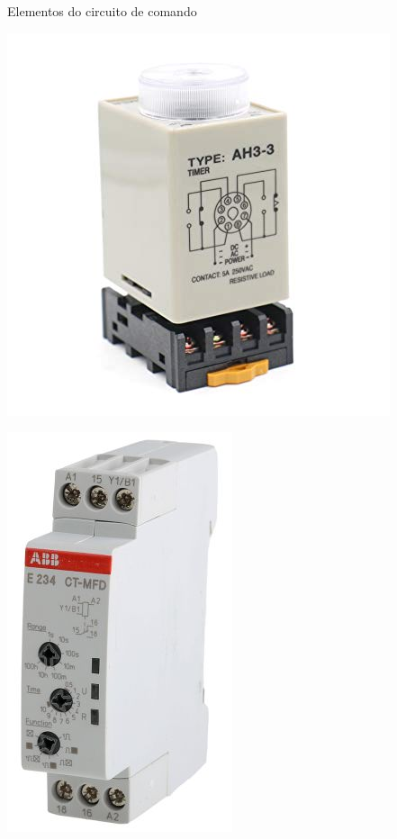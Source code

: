 \begin{frame}{Elementos do circuito de comando}
\begin{minipage}{0.45\linewidth}
	\centering
	\includegraphics[width=1.3\linewidth]{Figuras/Ch06/fig15.jpg}
\end{minipage}
\hfill
\begin{minipage}{0.45\linewidth}
	\centering
	\includegraphics[width=0.6\linewidth]{Figuras/Ch06/fig16.jpg}
\end{minipage}
\end{frame}


